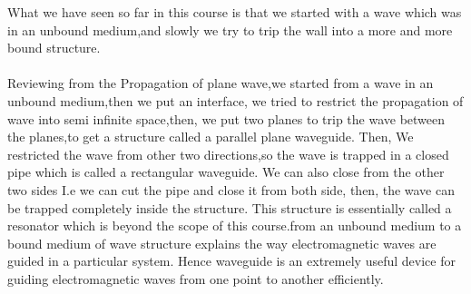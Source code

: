 What we have seen so far in this course is that we started with a wave which was in an unbound medium,and slowly we try to trip the wall into a more and more bound structure.\\\\ 
Reviewing from the Propagation  of plane wave,we started from a wave in an unbound  medium,then we put an interface, we tried to restrict the propagation of wave into semi infinite space,then, we put two planes to trip the wave between  the  planes,to get a structure called a parallel plane waveguide. Then, We restricted the wave from other two directions,so the wave is trapped in a closed pipe which is called a rectangular  waveguide. We can also close from the other two sides I.e we can cut the pipe and close it from both side, then, the wave can be trapped  completely  inside the structure. This structure is essentially  called a resonator which is beyond the scope of this course.from an unbound  medium  to a bound medium  of wave structure explains the way electromagnetic waves are guided in a particular  system. Hence waveguide is an extremely useful device for guiding electromagnetic waves from  one point to another efficiently.